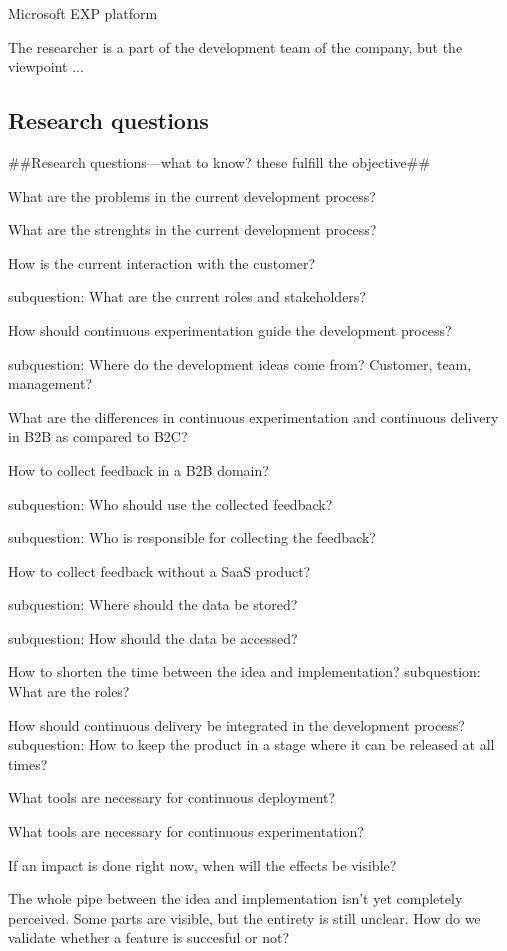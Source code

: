 \documentclass[english]{tktltiki2}
\theoremstyle{definition}
\theoremstyle{remark}
\begin{document}
Microsoft EXP platform

The researcher is a part of the development team of the company, but the viewpoint ...

\subsection{Research questions} %
##Research questions—what to know? these fulfill the objective##

What are the problems in the current development process?

What are the strenghts in the current development process?

How is the current interaction with the customer?
	
	subquestion: What are the current roles and stakeholders?

How should continuous experimentation guide the development process?
	
	subquestion: Where do the development ideas come from? Customer, team, management?

What are the differences in continuous experimentation and continuous delivery in B2B as compared to B2C?

How to collect feedback in a B2B domain?

	subquestion: Who should use the collected feedback?

	subquestion: Who is responsible for collecting the feedback?

How to collect feedback without a SaaS product?

    subquestion: Where should the data be stored?

    subquestion: How should the data be accessed?

How to shorten the time between the idea and implementation?
	subquestion: What are the roles?

How should continuous delivery be integrated in the development process?
	subquestion: How to keep the product in a stage where it can be released at all times?

What tools are necessary for continuous deployment?

What tools are necessary for continuous experimentation?

If an impact is done right now, when will the effects be visible?

The whole pipe between the idea and implementation isn't yet completely perceived. Some parts are visible, but the entirety is still unclear.
How do we validate whether a feature is succesful or not? 
\end{document}
